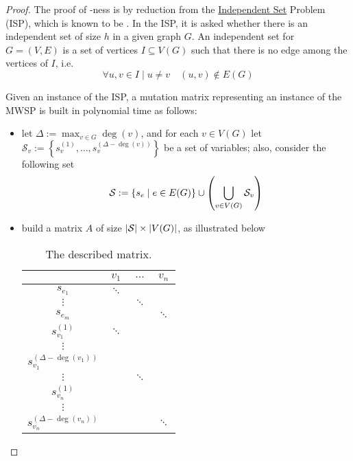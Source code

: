 \begin{proof}
    The proof of \NPHard-ness is by reduction from the \href{https://en.wikipedia.org/wiki/Independent_set_(graph_theory)}{Independent Set} Problem (ISP), which is known to be \NPHard \cite{hochbaum}. In the ISP, it is asked whether there is an independent set of size $h$ in a given graph $G$. An independent set for $G = (V, E)$ is a set of vertices $I \subseteq V(G)$ such that there is no edge among the vertices of $I$, i.e. $$\forall u, v \in I \mid u \neq v \quad (u, v) \notin E(G)$$

    Given an instance of the ISP, a mutation matrix representing an instance of the MWSP is built in polynomial time as follows:

    \begin{itemize}
        \item let $\Delta := \max_{v \in G}{\deg(v)}$, and for each $v \in V(G)$ let $\mathcal S_v := \left\{s_v^{(1)}, \ldots, s_v^{(\Delta - \deg(v))}\right\}$ be a set of variables; also, consider the following set $$\mathcal S := \left\{s_e \mid e \in E(G)\right\} \cup \left(\bigcup_{v \in V(G)}{\mathcal S_v}\right)$$
        \item build a matrix $A$ of size $\left|\mathcal S\right| \times \left|V(G)\right|$, as illustrated below

            \begin{table}[H]
                \centering
                \begin{tabular}{c|ccc}
                          & $v_1$ & $\ldots$ & $v_n$ \\
                    \hline
                    $s_{e_1}$ & $\ddots$ & & \\
                    $\vdots$ & & $\ddots$ & \\
                    $s_{e_m}$ & & & $\ddots$ \\
                    \hline
                    $s_{v_1}^{(1)}$ & $\ddots$ & & \\
                    $\vdots$ & & & \\
                    $s_{v_1}^{(\Delta - \deg(v_1))}$ & & & \\
                    $\vdots$ & & $\ddots$ & \\
                    $s_{v_n}^{(1)}$ & &  & \\
                    $\vdots$ & & & \\
                    $s_{v_n}^{(\Delta - \deg(v_n))}$ & & & $\ddots$
                \end{tabular}
                \caption{The described matrix.}
            \end{table}


\end{itemize}
\end{proof}
